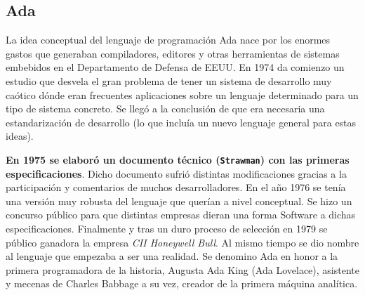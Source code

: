 \subsection{Ada}

La idea conceptual del lenguaje de programación Ada nace por los
enormes gastos que generaban compiladores, editores y otras herramientas de
sistemas embebidos en el Departamento de Defensa de EEUU. En 1974 da comienzo un
estudio que desvela el gran problema de tener un sistema de desarrollo muy
caótico dónde eran frecuentes aplicaciones sobre un lenguaje determinado para un
tipo de sistema concreto. Se llegó a la conclusión de que era necesaria una
estandarización de desarrollo (lo que incluía un nuevo lenguaje general para
estas ideas).


\textbf{En 1975 se elaboró un documento técnico (\texttt{Strawman}) con las primeras
especificaciones}. Dicho documento sufrió distintas modificaciones gracias a la
participación y comentarios de muchos desarrolladores. En el año 1976 se tenía
una versión muy robusta del lenguaje que querían a nivel conceptual. Se hizo
un concurso público para que distintas empresas dieran una forma Software a dichas
especificaciones. Finalmente y tras un duro proceso de selección en 1979 se
público ganadora la empresa \textit{CII Honeywell Bull}. Al mismo tiempo se dio
nombre al lenguaje que empezaba a ser una realidad. Se denomino Ada en
honor a la primera programadora de la historia, Augusta Ada King (Ada
Lovelace),
asistente y mecenas de Charles Babbage a su vez, creador de la primera máquina
analítica.  


